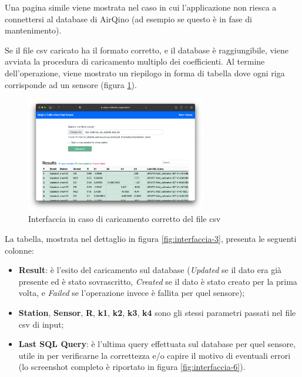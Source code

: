 Una pagina simile viene mostrata nel caso in cui l'applicazione non riesca a connettersi al database di AirQino (ad esempio se questo è in fase di mantenimento).

Se il file csv caricato ha il formato corretto, e il database è raggiungibile, viene avviata la procedura di caricamento multiplo dei coefficienti. Al termine dell'operazione, viene mostrato un riepilogo in forma di tabella dove ogni riga corrisponde ad un sensore (figura \ref{fig:interfaccia-2}).

\begin{figure}[H]
\centering
\includegraphics[width=0.70\textwidth,height=\textheight,keepaspectratio]{img/interfaccia_2}
\caption{Interfaccia in caso di caricamento corretto del file csv}
\label{fig:interfaccia-2}
\end{figure}

La tabella, mostrata nel dettaglio in figura \ref{fig:interfaccia-3}, presenta le seguenti colonne:
\begin{itemize}
  \item \textbf{Result}: è l'esito del caricamento sul database (\textit{Updated} se il dato era già presente ed è stato sovrascritto, \textit{Created} se il dato è stato creato per la prima volta, e \textit{Failed} se l'operazione invece è fallita per quel sensore);
  \item \textbf{Station}, \textbf{Sensor}, \textbf{R}, \textbf{k1}, \textbf{k2}, \textbf{k3}, \textbf{k4} sono gli stessi parametri passati nel file csv di input;
  \item \textbf{Last SQL Query}: è l'ultima query effettuata sul database per quel sensore, utile in per verificarne la correttezza e/o capire il motivo di eventuali errori (lo screenshot completo è riportato in figura \ref{fig:interfaccia-6}).
\end{itemize}

